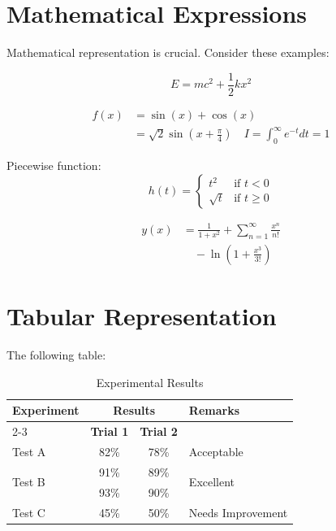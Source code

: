\documentclass[11pt]{article}
\begin{document}
\section{Mathematical Expressions}
Mathematical representation is crucial. Consider these examples:

\begin{equation}
    E=mc^{2}+\frac{1}{2}kx^{2}
\end{equation}

\begin{equation}
\begin{split}
    f(x) &= \sin(x)+\cos(x) \\
         &= \sqrt{2}\sin(x+\frac{\pi}{4}) \quad I=\int_{0}^{\infty}e^{-t}dt=1
\end{split}
\end{equation}

Piecewise function:
\begin{equation}
    h(t) = \begin{cases} 
        t^{2} & \text{if } t < 0 \\ 
        \sqrt{t} & \text{if } t \ge 0 
    \end{cases}
\end{equation}

\begin{equation}
\begin{split}
    y(x) &= \frac{1}{1+x^{2}}+\sum_{n=1}^{\infty}\frac{x^{n}}{n!} \\
         &\quad -\ln(1+\frac{x^{3}}{3!})
\end{split}
\end{equation}

\section{Tabular Representation}

The following table:

\begin{table}[h!]
    \centering
    \caption{Experimental Results}
    \vspace{0.2cm}
    \begin{tabular}{|l|c|c|l|}
        \hline
        \multirow{2}{*}{\textbf{Experiment}} & \multicolumn{2}{c|}{\textbf{Results}} & \multirow{2}{*}{\textbf{Remarks}} \\ \cline{2-3}
         & \textbf{Trial 1} & \textbf{Trial 2} & \\ \hline
        Test A & 82\% & 78\% & Acceptable \\ \hline
        \multirow{2}{*}{Test B} & 91\% & 89\% & \multirow{2}{*}{Excellent} \\ 
         & 93\% & 90\% & \\ \hline
        Test C & 45\% & 50\% & Needs Improvement \\ \hline
    \end{tabular}
\end{table}
\end{document}
